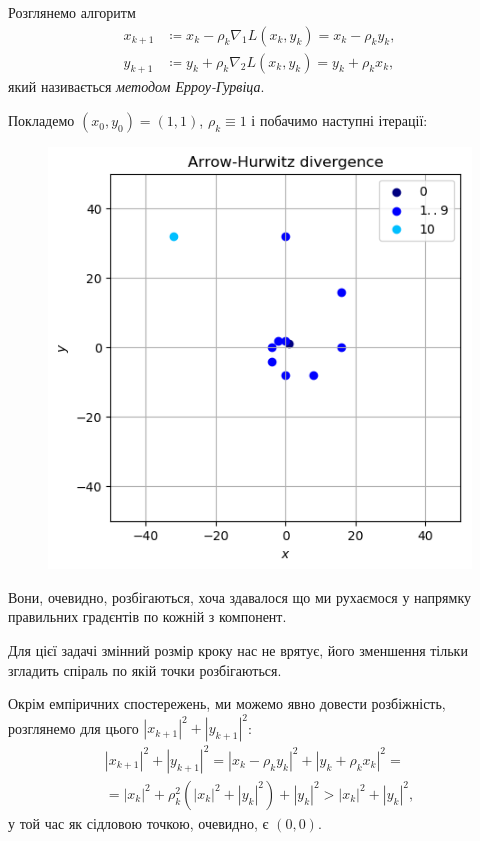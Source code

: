 \begin{solution}
    Розглянемо алгоритм
    \begin{equation}
        \begin{aligned}
            x_{k + 1} &\coloneqq x_k - \rho_k \nabla_1 L(x_k, y_k) = x_k - \rho_k y_k, \\
            y_{k + 1} &\coloneqq y_k + \rho_k \nabla_2 L(x_k, y_k) = y_k + \rho_k x_k,
        \end{aligned}
    \end{equation}
    який називається \textit{методом Ерроу-Гурвіца}. \medskip
    

    Покладемо $(x_0, y_0) = (1, 1)$, $\rho_k \equiv 1$ і побачимо наступні ітерації:
    \begin{figure}[H]
        \centering
        \includegraphics[width=.4\textwidth]{img/arrow-hurwitz-divergence.png}
    \end{figure}

    Вони, очевидно, розбігаються, хоча здавалося що ми рухаємося у напрямку правильних градєнтів по кожній з компонент.

    \begin{remark}
        Для цієї задачі змінний розмір кроку нас не врятує, його зменшення тільки згладить спіраль по якій точки розбігаються.
    \end{remark}

    Окрім емпіричних спостережень, ми можемо явно довести розбіжність, розглянемо для цього $|x_{k+1}|^2 + |y_{k+1}|^2$:
    \begin{multline}
        |x_{k+1}|^2 + |y_{k+1}|^2 = |x_k - \rho_k y_k|^2 + |y_k + \rho_k x_k|^2 = \\
        = |x_k|^2 + \rho_k^2 \left( |x_k|^2 + |y_k|^2 \right) + |y_k|^2 > |x_k|^2 + |y_k|^2,
    \end{multline}
    у той час як сідловою точкою, очевидно, є $(0, 0)$.
\end{solution}

